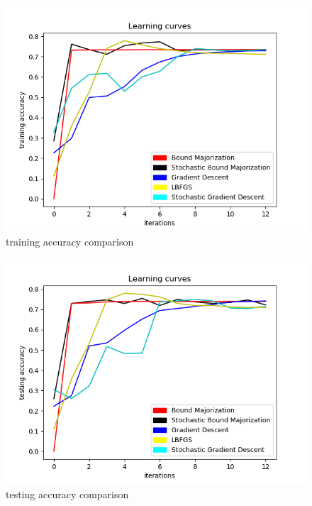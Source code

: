 \documentclass{beamer}
\begin{document}
  \begin{frame}
    \begin{block}{}
      \begin{figure}[htbp]
        \includegraphics[width = .85\textwidth]{train_accuracy}
        \caption{training accuracy comparison}
      \end{figure}
    \end{block}
    \end{frame}

    \begin{frame}
      \begin{block}{}
        \begin{figure}[htbp]
          \includegraphics[width = .85\textwidth]{test_accuracy}
          \caption{testing accuracy comparison}
        \end{figure}
      \end{block}
      \end{frame}
\end{document}
